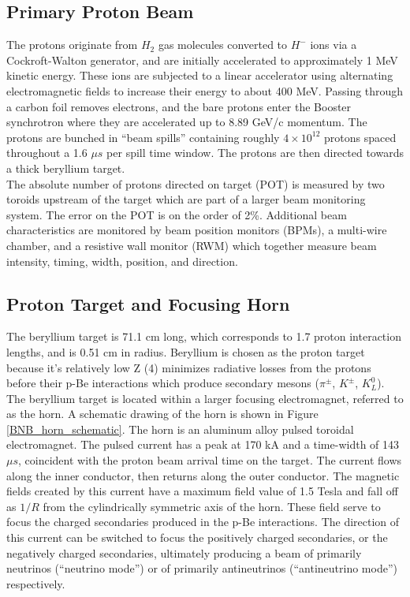 \subsection{Primary Proton Beam}
The protons originate from $H_2$ gas molecules converted to $H^-$ ions via a Cockroft-Walton generator, and are initially accelerated to approximately 1 MeV kinetic energy. These ions are subjected to a linear accelerator using alternating electromagnetic fields to increase their energy to about 400 MeV. Passing through a carbon foil removes electrons, and the bare protons enter the Booster synchrotron where they are accelerated up to 8.89 GeV/c momentum. The protons are bunched in ``beam spills'' containing roughly $4\times10^{12}$ protons spaced throughout a 1.6 $\mu s$ per spill time window. The protons are then directed towards a thick beryllium target.\\

The absolute number of protons directed on target (POT) is measured by two toroids upstream of the target which are part of a larger beam monitoring system. The error on the POT is on the order of 2\%. Additional beam characteristics are monitored by beam position monitors (BPMs), a multi-wire chamber, and a resistive wall monitor (RWM) which together measure beam intensity, timing, width, position, and direction.

\subsection{Proton Target and Focusing Horn}
The beryllium target is 71.1 cm long, which corresponds to 1.7 proton interaction lengths, and is 0.51 cm in radius. Beryllium is chosen as the proton target because it's relatively low Z (4) minimizes radiative losses from the protons before their p-Be interactions which produce secondary mesons ($\pi^\pm$, $K^\pm$, $K^0_L$).\\

The beryllium target is located within a larger focusing electromagnet, referred to as the horn. A schematic drawing of the horn is shown in Figure \ref{BNB_horn_schematic}. The horn is an aluminum alloy pulsed toroidal electromagnet. The pulsed current has a peak at 170 kA and a time-width of 143 $\mu s$, coincident with the proton beam arrival time on the target. The current flows along the inner conductor, then returns along the outer conductor. The magnetic fields created by this current have a maximum field value of 1.5 Tesla and fall off as $1/R$ from the cylindrically symmetric axis of the horn. These field serve to focus the charged secondaries produced in the p-Be interactions. The direction of this current can be switched to focus the positively charged secondaries, or the negatively charged secondaries, ultimately producing a beam of primarily neutrinos (``neutrino mode'') or of primarily antineutrinos (``antineutrino mode'') respectively.\\

